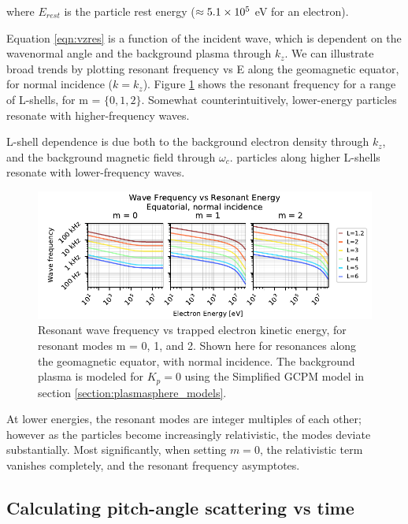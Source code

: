 where $E_{rest}$ is the particle rest energy ($\approx 5.1\times 10^{5}$ eV for an electron).

Equation \eqref{eqn:vzres} is a function of the incident wave, which is dependent on the wavenormal angle and the background plasma through $k_z$. We can illustrate broad trends by plotting resonant frequency vs E along the geomagnetic equator, for normal incidence ($k = k_z$). Figure \ref{fig:vzres_vs_modes} shows the resonant frequency for a range of L-shells, for m = $\{0,1,2\}$. Somewhat counterintuitively, lower-energy particles resonate with higher-frequency waves.

L-shell dependence is due both to the background electron density through $k_z$, and the background magnetic field through $\omega_c$. particles along higher L-shells resonate with lower-frequency waves.

\begin{figure}[h]
\begin{center}
\includegraphics{figures/wave_frequency_vs_energy_vs_mode_3up.pdf}

\caption[Resonant frequency vs particle energy for resonant modes 0, 1, and 2]{Resonant wave frequency vs trapped electron kinetic energy, for resonant modes m = 0, 1, and 2. Shown here for resonances along the geomagnetic equator, with normal incidence. The background plasma is modeled for $K_p=0$ using the Simplified GCPM model in section \ref{section:plasmasphere_models}.}
\label{fig:vzres_vs_modes}
\end{center}
\end{figure}

At lower energies, the resonant modes are integer multiples of each other; however as the particles become increasingly relativistic, the modes deviate substantially. Most significantly, when setting $m=0$, the relativistic term vanishes completely, and the resonant frequency asymptotes.

\subsection{Calculating pitch-angle scattering vs time}

